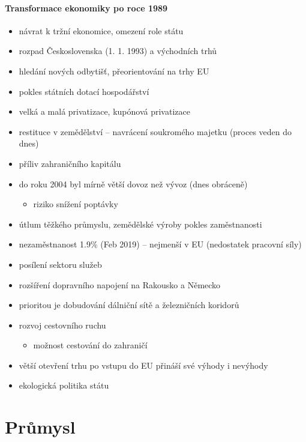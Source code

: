 \begin{itemize}
\paragraph{Transformace ekonomiky po roce 1989}
\begin{itemize}
\item návrat k tržní ekonomice, omezení role státu
\item rozpad Československa (1. 1. 1993) a východních trhů
\item hledání nových odbytišť, přeorientování na trhy EU
\item pokles státních dotací hospodářství
\item velká a malá privatizace, kupónová privatizace
\item restituce v zemědělství -- navrácení soukromého majetku (proces veden do dnes)
\item příliv zahraničního kapitálu
\item do roku 2004 byl mírně větší dovoz než vývoz (dnes obráceně)
	\begin{itemize}
	\item riziko snížení poptávky
	\end{itemize}
\item útlum těžkého průmyslu, zemědělské výroby \ra pokles zaměstnanosti
\item nezaměstnanost 1.9\% (Feb 2019) -- nejmenší v EU (nedostatek pracovní síly)
\item posílení sektoru služeb
\item rozšíření dopravního napojení na Rakousko a Německo
\item prioritou je dobudování dálniční sítě a železničních koridorů
\item rozvoj cestovního ruchu
	\begin{itemize}
	\item možnost cestování do zahraničí
	\end{itemize}
\item větší otevření trhu po vstupu do EU přináší své výhody i nevýhody
\item ekologická politika státu
\end{itemize}
\end{itemize}




\section{Průmysl}
